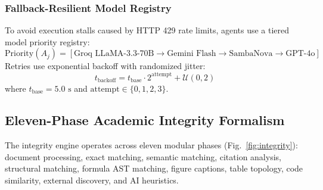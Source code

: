 \documentclass[conference]{IEEEtran}
\begin{document}
\subsubsection{Fallback-Resilient Model Registry}
To avoid execution stalls caused by HTTP 429 rate limits, agents use a tiered model priority registry:
\begin{equation}
\mathrm{Priority}(A_j) = [\text{Groq LLaMA-3.3-70B} \to \text{Gemini Flash} \to \text{SambaNova} \to \text{GPT-4o}]
\label{eq:fallback}
\end{equation}
Retries use exponential backoff with randomized jitter:
\begin{equation}
t_{\mathrm{backoff}} = t_{\mathrm{base}} \cdot 2^{\mathrm{attempt}} + \mathcal{U}(0, 2)
\label{eq:backoff}
\end{equation}
where $t_{\mathrm{base}} = 5.0\text{ s}$ and $\mathrm{attempt} \in \{0, 1, 2, 3\}$.

\subsection{Eleven-Phase Academic Integrity Formalism}
The integrity engine operates across eleven modular phases (Fig.~\ref{fig:integrity}): document processing, exact matching, semantic matching, citation analysis, structural matching, formula AST matching, figure captions, table topology, code similarity, external discovery, and AI heuristics.
\end{document}
